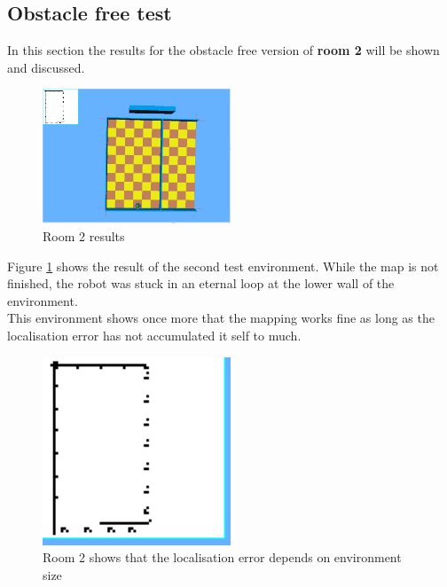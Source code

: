 \subsection{Obstacle free test}
In this section the results for the obstacle free version of \textbf{room 2} will be shown and discussed. \\[3ex]

\begin{figure}[h]
\centering
\includegraphics[width = 0.5\textwidth]{../../figures/map_results/save_corner_with_odometry_error.png} 
\caption{Room 2 results}
\label{room2_results}
\end{figure}

Figure \ref{room2_results} shows the result of the second test environment. 
While the map is not finished, the robot was stuck in an eternal loop at the lower wall of the environment.\\
This environment shows once more that the mapping works fine as long as the localisation error has not accumulated it self to much. \\

\begin{figure}[h]
\centering
\includegraphics[width = 0.5\textwidth]{../../figures/map_results/minimum_localisation_error.png} 
\caption{Room 2 shows that the localisation error depends on environment size}
\label{room2_error}
\end{figure}

